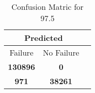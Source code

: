 \begin{table}[] 
\caption{Confusion Matric for 97.5} 
\label{Table: Prediction Accuracy-DMD97.5OnlySunEKF-resetReflectionperfectNoFailurePrediction-Reflection} 
\centering 
\begin{tabular} 
 {@{}ccc@{}} 
\toprule 
\multicolumn{2}{c}{\textbf{Predicted}}
 \\ \midrule 
\multicolumn{1}{|c|}{Failure} & 
\multicolumn{1}{c|}{No Failure}
 \\ \midrule 
\multicolumn{1}{|c|}{\color{green}\textbf{130896}} & 
\multicolumn{1}{c|}{\color{red}\textbf{0}}
 \\ \midrule 
\multicolumn{1}{|c|}{\color{red}\textbf{971}} & 
\multicolumn{1}{c|}{\color{green}\textbf{38261}}
 \\ \bottomrule 
\end{tabular} 
\end{table} 
